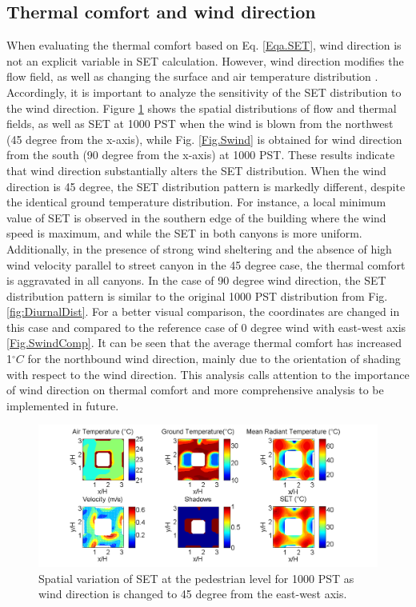 \documentclass[smallextended]{svjour3}
\newcommand{\degree}{\ensuremath{^\circ}}
\begin{document}
\subsection{Thermal comfort and wind direction}
When evaluating the thermal comfort  based on Eq. \ref{Eqa.SET}, wind direction is not an explicit variable in SET calculation. However,  wind direction modifies the flow field, as well as changing the surface and air temperature distribution \citep{nazarian2014effects}. Accordingly, it is important to analyze the sensitivity of the SET distribution to the wind direction. Figure \ref{Fig.NWwind} shows the spatial distributions of flow and thermal fields, as well as SET at 1000 PST when the wind is blown from the northwest (45 degree from the x-axis), while Fig. \ref{Fig.Swind} is obtained for wind direction from the south (90 degree from the x-axis) at 1000 PST. These results indicate that wind direction substantially alters the SET distribution. When the wind direction is 45 degree, the SET distribution pattern is markedly different, despite the identical ground temperature distribution. For instance, a local minimum value of SET is observed in the southern edge of the building where the wind speed is maximum, and while the SET in both canyons is more uniform. Additionally, in the presence of strong wind sheltering and the absence of high wind velocity parallel to street canyon in the 45 degree case, the thermal comfort is aggravated in all canyons. In the case of 90 degree wind direction, the SET distribution pattern is  similar to the original 1000 PST distribution from Fig. \ref{fig:DiurnalDist}. For a better visual comparison, the coordinates are changed in this case and compared to the reference case of 0 degree wind with east-west axis \ref{Fig.SwindComp}. It can be seen that the average thermal comfort has increased 1$\degree C$ for the northbound wind direction, mainly due to the orientation of shading with respect to the wind direction. This analysis calls attention to the importance of wind direction on thermal comfort and more comprehensive analysis to be implemented in future. 
\begin{figure}[!h]
\graphicspath{ {image/} }
\centerline{\includegraphics[width=\textwidth]{Theta45_10AM.png}}    
\caption{Spatial variation of SET at the pedestrian level for 1000 PST as wind direction is changed to 45 degree from the east-west axis.}    
\label{Fig.NWwind}
\end{figure}
\end{document}
